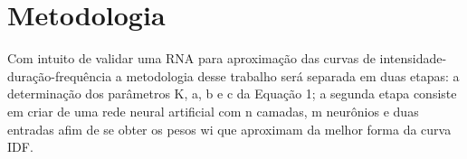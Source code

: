\chapter{Metodologia}

Com intuito de validar uma RNA para aproximação das curvas de intensidade-duração-frequência a metodologia desse trabalho será separada em duas etapas: a determinação dos parâmetros K, a, b e c da Equação 1; a segunda etapa consiste em criar de uma rede neural artificial com n camadas, m neurônios e duas entradas afim de se obter os pesos wi que aproximam da melhor forma da curva IDF.






